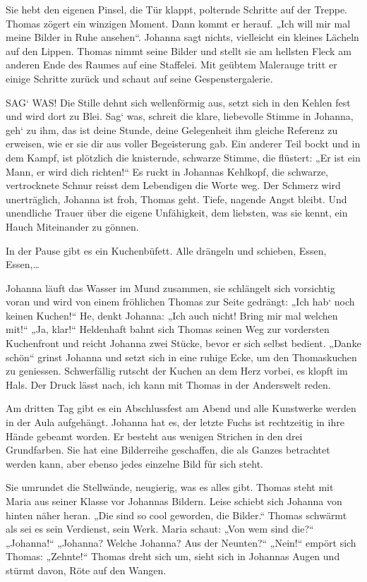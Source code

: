 \documentclass[10pt,a5paper]{book}
\begin{document}
Sie hebt den eigenen Pinsel, die Tür klappt, polternde Schritte auf der Treppe. Thomas zögert ein winzigen Moment. Dann kommt er herauf. „Ich will mir mal meine Bilder in Ruhe ansehen“. Johanna sagt nichts, vielleicht ein kleines Lächeln auf den Lippen. Thomas nimmt seine Bilder und stellt sie am hellsten Fleck am anderen Ende des Raumes auf eine Staffelei. Mit geübtem Malerauge tritt er einige Schritte zurück und  schaut auf seine Gespenstergalerie.

SAG` WAS! Die Stille dehnt sich wellenförmig aus, setzt sich in den Kehlen fest und wird dort zu Blei. Sag` was, schreit die klare, liebevolle Stimme in Johanna, geh` zu ihm, das ist deine Stunde, deine Gelegenheit ihm gleiche Referenz zu erweisen, wie er sie dir aus voller Begeisterung gab.
Ein anderer Teil bockt und in dem Kampf, ist plötzlich die knisternde, schwarze Stimme, die flüstert: „Er ist ein Mann, er wird dich richten!“ Es ruckt in Johannas Kehlkopf, die schwarze, vertrocknete Schnur reisst dem Lebendigen die Worte weg. Der Schmerz wird unerträglich, Johanna ist froh, Thomas geht. Tiefe, nagende Angst bleibt. Und unendliche Trauer über die eigene Unfähigkeit, dem liebsten, was sie kennt, ein Hauch Miteinander zu gönnen.

In der Pause gibt es ein Kuchenbüfett. Alle drängeln und schieben, Essen, Essen,\dots 

Johanna läuft das Wasser im Mund zusammen, sie schlängelt sich vorsichtig voran und wird von einem fröhlichen Thomas zur Seite gedrängt: „Ich hab` noch keinen Kuchen!“ He, denkt Johanna: „Ich auch nicht! Bring mir mal welchen mit!“ „Ja, klar!“ Heldenhaft  bahnt sich Thomas seinen Weg zur vordersten Kuchenfront und reicht Johanna  zwei Stücke, bevor er sich selbst bedient. „Danke schön“ grinst Johanna und setzt sich in eine ruhige Ecke, um den Thomaskuchen zu geniessen. Schwerfällig rutscht der  Kuchen an dem Herz vorbei, es klopft im Hals. Der Druck lässt nach, ich kann mit Thomas in der Anderswelt reden.

Am dritten Tag gibt es ein Abschlussfest am Abend und alle Kunstwerke werden in der Aula aufgehängt. Johanna hat es, der letzte Fuchs ist rechtzeitig in ihre Hände gebeamt worden. Er besteht aus wenigen Strichen in den drei Grundfarben. Sie hat eine Bilderreihe geschaffen, die als Ganzes betrachtet werden kann, aber ebenso jedes einzelne Bild für sich steht.

Sie umrundet die Stellwände, neugierig, was es alles gibt. Thomas steht mit Maria aus seiner Klasse vor Johannas Bildern. Leise schiebt sich Johanna von hinten näher heran. „Die sind so cool geworden, die Bilder.“ Thomas schwärmt als sei es sein Verdienst, sein Werk. Maria schaut: „Von wem sind die?“ „Johanna!“ „Johanna? Welche Johanna? Aus der Neunten?“ „Nein!“ empört sich Thomas: „Zehnte!“ Thomas dreht sich um, sieht sich in Johannas Augen und stürmt davon, Röte auf den Wangen.
\end{document}
